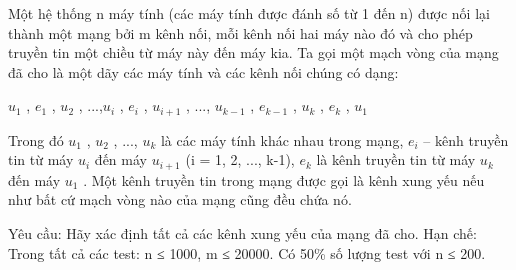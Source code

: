 Một hệ thống n máy tính (các máy tính được đánh số từ 1 đến n) được nối lại thành một mạng bởi m kênh nối, mỗi kênh nối hai máy nào đó và cho phép truyền tin một chiều từ máy này đến máy kia. Ta gọi một mạch vòng của mạng đã cho là một dãy các máy tính và các kênh nối chúng có dạng:

$u_{1}$ , $e_{1}$ , $u_{2}$ , ...,$u_{i}$ , $e_{i}$ , $u_{i+1}$ , ..., $u_{k-1}$ , $e_{k-1}$ , $u_{k}$ , $e_{k}$ , $u_{1}$

Trong đó $u_{1}$ , $u_{2}$ , ..., $u_{k}$ là các máy tính khác nhau trong mạng, $e_{i}$ – kênh truyền tin từ máy $u_{i}$ đến máy $u_{i+1}$ (i = 1, 2, ..., k-1), $e_{k}$ là kênh truyền tin từ máy $u_{k}$ đến máy $u_{1}$ . Một kênh truyền tin trong mạng được gọi là kênh xung yếu nếu như bất cứ mạch vòng nào của mạng cũng đều chứa nó.

Yêu cầu: Hãy xác định tất cả các kênh xung yếu của mạng đã cho.
Hạn chế:
Trong tất cả các test: n ≤ 1000, m ≤ 20000. Có 50\% số lượng test với n ≤ 200.